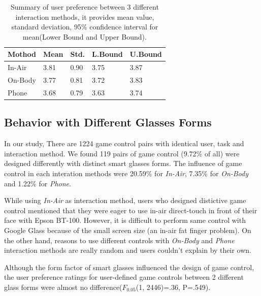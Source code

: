 \documentclass{sigchi}
\newcommand\tabhead[1]{\small\textbf{#1}}
\begin{document}
  \begin{table}
    \centering
    \begin{tabular}{|l|l|l|l|l|}
      \hline
      \tabhead{Mothod} &
      \multicolumn{1}{|p{0.13\columnwidth}|}{\centering\tabhead{Mean}} &
      \multicolumn{1}{|p{0.13\columnwidth}|}{\centering\tabhead{Std.}} &
      \multicolumn{1}{|p{0.13\columnwidth}|}{\centering\tabhead{L.Bound}} &
      \multicolumn{1}{|p{0.13\columnwidth}|}{\centering\tabhead{U.Bound}} \\
      \hline
      In-Air & 3.81 & 0.90 & 3.75 & 3.87\\
      \hline
      On-Body & 3.77 & 0.81 & 3.72 & 3.83\\
      \hline
      Phone & 3.68 & 0.79 & 3.63 & 3.74\\
      \hline

    \end{tabular}
    \caption{Summary of user preference between 3 different interaction methods, it provides mean value, standard deviation, 95\% confidence interval for mean(Lower Bound and Upper Bound).}
    \label{tab:tablePreferenceInteractionMethod}
  \end{table}

  \subsection{Behavior with Different Glasses Forms}
  In our study, There are 1224 game control pairs with identical user, task and interaction method. We found 119 pairs of game control (9.72\% of all) were designed differently with distinct smart glasses forms. The influence of game control in each interation methods were 20.59\% for \emph{In-Air}, 7.35\% for \emph{On-Body} and 1.22\% for \emph{Phone}. 

  While using \emph{In-Air} as interaction method, users who designed distictive game control mentioned that they were eager to use in-air direct-touch in front of their face with Epson BT-100. However, it is difficult to perform same control with Google Glass because of the small screen size (an in-air fat finger problem). On the other hand, reasons to use different controls with \emph{On-Body} and \emph{Phone} interaction methods are really random and users couldn't explain by their own.

  Although the form factor of smart glasses influenced the design of game control, the user preference ratings for user-defined game controls between 2 different glass forms were almost no difference($F_{0.05}$(1, 2446)=.36, P=.549).
\end{document}
